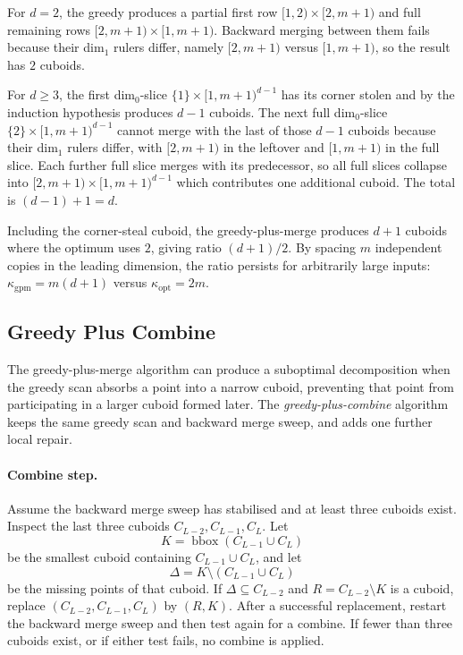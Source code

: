 \documentclass[manuscript,screen,review]{acmart}
\theoremstyle{definition}
\theoremstyle{plain}
\begin{document}
For $d = 2$, the greedy produces a partial first row
$
  [1,2){\times}[2,m{+}1)
$
and full remaining rows
$  [2,m{+}1){\times}[1,m{+}1)$.
Backward merging between them fails because their dim$_1$ rulers differ,
namely $[2,m{+}1)$ versus $[1,m{+}1)$, so the result has $2$ cuboids.

For $d \geq 3$, the first dim$_0$-slice $\{1\}{\times}[1,m{+}1)^{d-1}$
has its corner stolen and by the induction hypothesis produces $d - 1$
cuboids. The next full dim$_0$-slice
$
  \{2\}{\times}[1,m{+}1)^{d-1}
$
cannot merge with the last of those $d - 1$ cuboids because their dim$_1$
rulers differ, with $[2,m{+}1)$ in the leftover and $[1,m{+}1)$ in the
full slice. Each further full slice merges with its predecessor, so all
full slices collapse into
$[2,m{+}1){\times}[1,m{+}1)^{d-1}$
which contributes one additional cuboid. The total is $(d-1)+1 = d$.

Including the corner-steal cuboid, the greedy-plus-merge produces $d + 1$ cuboids where the optimum uses $2$, giving ratio $(d+1)/2$. By spacing $m$ independent copies in the leading dimension, the ratio persists for arbitrarily large inputs: $\kappa_{\text{gpm}} = m(d+1)$ versus $\kappa_{\text{opt}} = 2m$.

\subsection{Greedy Plus Combine}

The greedy-plus-merge algorithm can produce a suboptimal decomposition when the greedy scan absorbs a point into a narrow cuboid, preventing that point from participating in a larger cuboid formed later. The \emph{greedy-plus-combine} algorithm keeps the same greedy scan and backward merge sweep, and adds one further local repair.

\paragraph{Combine step.}
Assume the backward merge sweep has stabilised and at least three cuboids exist. Inspect the last three cuboids $C_{L-2}, C_{L-1}, C_L$. Let
\[
  K = \operatorname{bbox}(C_{L-1} \cup C_L)
\]
be the smallest cuboid containing $C_{L-1} \cup C_L$, and let
\[
  \Delta = K \setminus (C_{L-1} \cup C_L)
\]
be the missing points of that cuboid. If $\Delta \subseteq C_{L-2}$ and $R = C_{L-2} \setminus K$ is a cuboid, replace $(C_{L-2}, C_{L-1}, C_L)$ by $(R, K)$. After a successful replacement, restart the backward merge sweep and then test again for a combine. If fewer than three cuboids exist, or if either test fails, no combine is applied.
\end{document}
